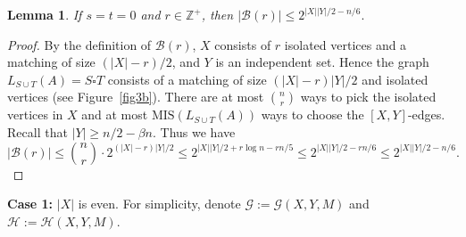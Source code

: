 \documentclass[12pt]{article}
\newtheorem{lemma}[theorem]{Lemma}
\theoremstyle{definition}
\theoremstyle{definition}
\theoremstyle{definition}
\theoremstyle{definition}
\theoremstyle{definition}
\theoremstyle{definition}
\theoremstyle{definition}
\newcommand{\cH}{\mathcal{H}}
\newcommand{\cG}{\mathcal{G}}
\newcommand{\cB}{\mathcal{B}}
\newcommand{\3}{\bf{3}}
\newcommand{\MIS}{\mathrm{MIS}}
\newcommand{\setm}{-}
\begin{document}
\begin{lemma}\label{claim-r}
If $s=t=0$ and $r\in\mathbb{Z}^+$, then $|\cB(r)|\le 2^{|X||Y|/2-n/6}.$
\end{lemma}
\begin{proof}
By the definition of $\cB(r)$, $X$ consists of $r$ isolated vertices and a matching of size $(|X|-r)/2$, and $Y$ is an independent set. Hence the graph $L_{S\cup T}(A)=S\square T$ consists of a matching of size $(|X|-r)|Y|/2$ and isolated vertices (see Figure~\ref{fig3b}). 
There are at most ${n\choose r}$ ways to pick the isolated vertices in $X$ and at most $\MIS(L_{S\cup T}(A))$ ways to choose the $[X,Y]$-edges. Recall that $|Y|\ge n/2-\beta n$. Thus we have
$$|\cB(r)|\le {n\choose r}\cdot 2^{(|X|-r)|Y|/2}\le 2^{|X||Y|/2+r\log n-rn/5}\le 2^{|X||Y|/2-rn/6} \le 2^{|X||Y|/2-n/6}.$$
\end{proof}


\medskip

\noindent\textbf{Case 1:} $|X|$ is even. For simplicity, denote $\cG:=\cG(X,Y,M)$ and $\cH:=\cH(X,Y,M)$.

\medskip

%
\end{document}
